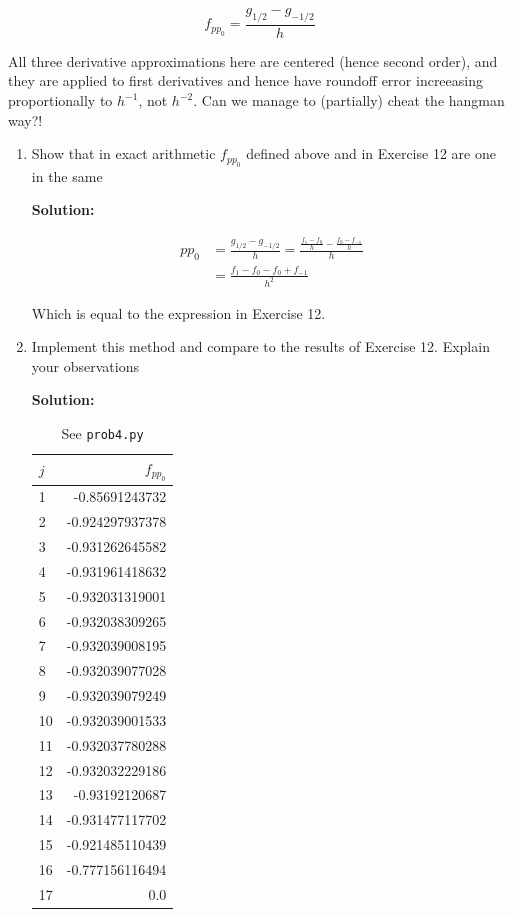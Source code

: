 \documentclass[12pt]{article}
\begin{document}
\begin{enumerate}
\[
	f_{pp_{0}} = \frac{g_{1/2} - g_{-1/2}}{h}
\]

All three derivative approximations here are centered (hence second order), and they are applied to first derivatives and hence have roundoff error increeasing proportionally to $h^{-1}$, not $h^{-2}$. Can we manage to (partially) cheat the hangman way?!

\begin{enumerate}
\item Show that in exact arithmetic $f_{pp_{0}}$ defined above and in Exercise 12 are one in the same

{\bf Solution:}

\begin{align*}
pp_{0} &= \frac{g_{1/2} - g_{-1/2}}{h} = \frac{\frac{f_{1} - f_{0}}{h} - \frac{f_{0} - f_{-1}}{h}}{h}\\
             &= \frac{f_{1} - f_{0} - f_{0} + f_{-1}}{h^{2}}
\end{align*}

Which is equal to the expression in Exercise 12.

\item Implement this method and compare to the results of Exercise 12. Explain your observations

{\bf Solution:}

\begin{table}[H]
\centering
\begin{tabular}{l r}
\hline \hline
$j$ & $f_{pp_{0}}$\\
\hline
1 & -0.85691243732 \\
2 & -0.924297937378 \\
3 & -0.931262645582 \\
4 & -0.931961418632 \\
5 & -0.932031319001 \\
6 & -0.932038309265 \\
7 & -0.932039008195 \\
8 & -0.932039077028 \\
9 & -0.932039079249 \\
10 & -0.932039001533 \\
11 & -0.932037780288 \\
12 & -0.932032229186 \\
13 & -0.93192120687 \\
14 & -0.931477117702 \\
15 & -0.921485110439 \\
16 & -0.777156116494 \\
17 & 0.0 \\
\hline
\end{tabular}
\caption{See {\tt prob4.py}}
\end{table}


\end{enumerate}
\end{enumerate}
\end{document}
